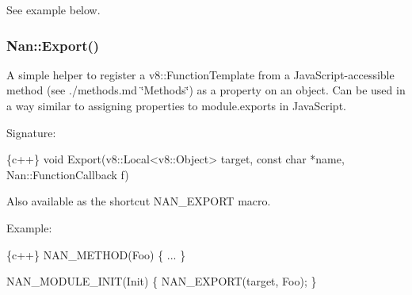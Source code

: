 See example below.

\label{_api_nan_export}%
 \subsubsection*{Nan\+::\+Export()}

A simple helper to register a {\ttfamily v8\+::\+Function\+Template} from a Java\+Script-\/accessible method (see ./methods.md \char`\"{}\+Methods\char`\"{}) as a property on an object. Can be used in a way similar to assigning properties to {\ttfamily module.\+exports} in Java\+Script.

Signature\+:


\begin{DoxyCode}
\{c++\}
void Export(v8::Local<v8::Object> target, const char *name, Nan::FunctionCallback f)
\end{DoxyCode}


Also available as the shortcut {\ttfamily N\+A\+N\+\_\+\+E\+X\+P\+O\+RT} macro.

Example\+:


\begin{DoxyCode}
\{c++\}
NAN\_METHOD(Foo) \{
  ...
\}

NAN\_MODULE\_INIT(Init) \{
  NAN\_EXPORT(target, Foo);
\}
\end{DoxyCode}
 